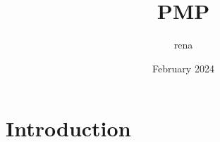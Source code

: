 \documentclass{article}
\title{PMP}
\author{rena }
\date{February 2024}
\begin{document}
\maketitle

\section{Introduction}
\end{document}
